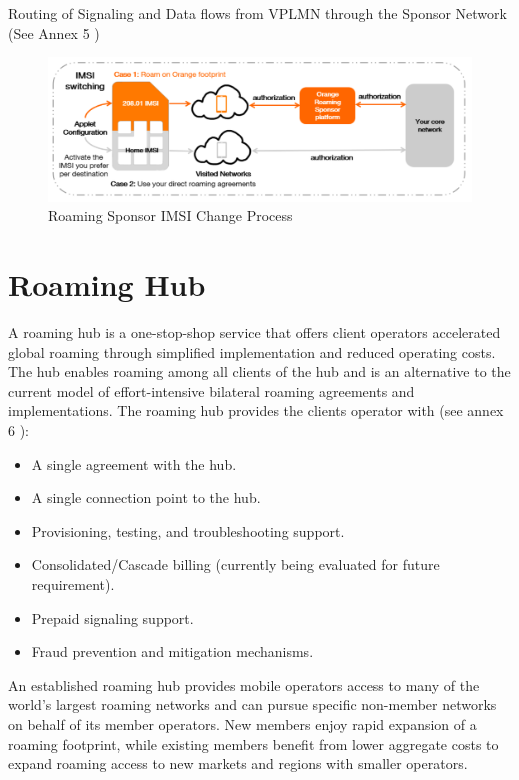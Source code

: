 Routing of Signaling and Data flows from \acs{VPLMN} through the Sponsor Network \cite{roaming-sponsor} (See Annex 5 \cite{annexes})\\

\begin{figure}[H]
    \centering
    \includegraphics[scale=0.35]{part2/romi.png}
\caption{Roaming Sponsor IMSI Change Process}
\end{figure}

\section{Roaming Hub}
\-\hspace{0.5cm} A roaming hub is a one-stop-shop service that offers client operators accelerated global roaming through simplified implementation and reduced operating costs. The hub enables roaming among all clients of the hub and is an alternative to the current model of effort-intensive bilateral roaming agreements and implementations. The roaming hub provides the clients operator with (see annex 6 \cite{annexes}):
\begin{itemize} 
    \setlength\itemsep{0.2em}
    \item A single agreement with the hub.
    \item A single connection point to the hub.
    \item Provisioning, testing, and troubleshooting support.
    \item Consolidated/Cascade billing (currently being evaluated for future requirement).
    \item Prepaid signaling support.
    \item Fraud prevention and mitigation mechanisms. 
\end{itemize}

An established roaming hub provides mobile operators access to many of the world’s largest roaming networks and can pursue specific non-member networks on behalf of its member operators. New members enjoy rapid expansion of a roaming footprint, while existing members benefit from lower aggregate costs to expand roaming access to new markets and regions with smaller operators.\\

